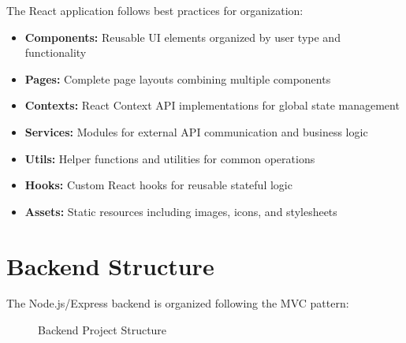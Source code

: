 \documentclass[12pt,a4paper]{report}
\begin{document}
The React application follows best practices for organization:
\begin{itemize}
    \item \textbf{Components:} Reusable UI elements organized by user type and functionality
    \item \textbf{Pages:} Complete page layouts combining multiple components
    \item \textbf{Contexts:} React Context API implementations for global state management
    \item \textbf{Services:} Modules for external API communication and business logic
    \item \textbf{Utils:} Helper functions and utilities for common operations
    \item \textbf{Hooks:} Custom React hooks for reusable stateful logic
    \item \textbf{Assets:} Static resources including images, icons, and stylesheets
\end{itemize}

\section{Backend Structure}
The Node.js/Express backend is organized following the MVC pattern:

\begin{figure}[H]
    \centering
    \caption{Backend Project Structure}
    \label{fig:backend-structure}
\end{figure}
\end{document}
